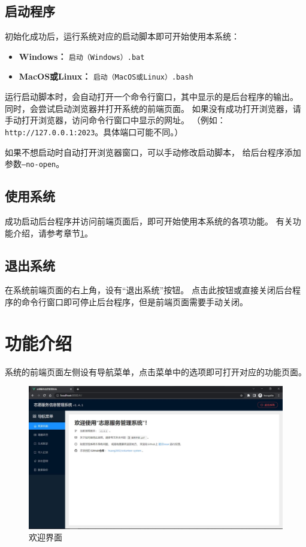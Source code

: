 \documentclass[12pt,titlepage]{article}
\begin{document}
\subsection{启动程序}

初始化成功后，运行系统对应的启动脚本即可开始使用本系统：

\begin{itemize}
    \item \textbf{Windows：} \texttt{启动（Windows）.bat}
    \item \textbf{MacOS或Linux：} \texttt{启动（MacOS或Linux）.bash}
\end{itemize}

运行启动脚本时，会自动打开一个命令行窗口，其中显示的是后台程序的输出。
同时，会尝试启动浏览器并打开系统的前端页面。
如果没有成功打开浏览器，请手动打开浏览器，访问命令行窗口中显示的网址。
（例如：\nolinkurl{http://127.0.0.1:2023}。具体端口可能不同。）

如果不想启动时自动打开浏览器窗口，可以手动修改启动脚本，
给后台程序添加参数\texttt{--no-open}。

\subsection{使用系统}

成功启动后台程序并访问前端页面后，即可开始使用本系统的各项功能。
有关功能介绍，请参考章节\ref{sec:functionalities}。

\subsection{退出系统}

在系统前端页面的右上角，设有“退出系统”按钮。
点击此按钮或直接关闭后台程序的命令行窗口即可停止后台程序，但是前端页面需要手动关闭。

\newpage
\section{功能介绍}
\label{sec:functionalities}

系统的前端页面左侧设有导航菜单，点击菜单中的选项即可打开对应的功能页面。

\begin{figure}[htbp]
    \centering
    \includegraphics[width=\textwidth]{../screenshots/home.jpg}
    \caption{欢迎界面}
\end{figure}
\end{document}
